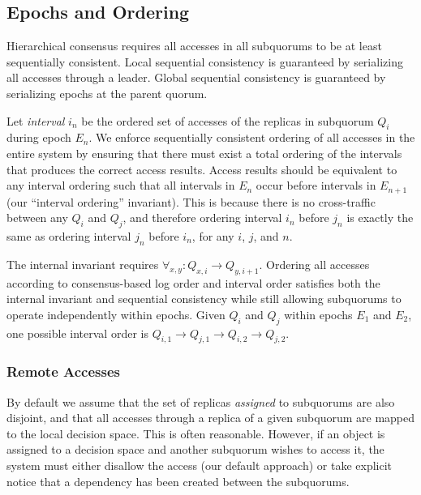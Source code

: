 \documentclass[11pt,letterpaper]{article}
\begin{document}
\subsection{Epochs and Ordering}
\vspace{-.5em}

Hierarchical consensus requires all accesses in all subquorums to be at least
sequentially consistent.
Local sequential consistency is guaranteed by serializing all accesses through a leader.
Global sequential consistency is guaranteed by serializing epochs at the parent quorum.

Let \emph{interval} $i_n$ be the ordered set of accesses of the replicas in subquorum
$Q_i$ during epoch $E_n$.
We enforce sequentially consistent ordering of all accesses in the entire system by
ensuring that there must exist a total ordering of the intervals that produces the correct
access results.
Access results should be equivalent to any interval ordering
such that all intervals in $E_n$ occur before intervals in $E_{n+1}$ (our ``interval
ordering'' invariant).
This is because there is no cross-traffic between any $Q_i$ and $Q_j$, and therefore
ordering interval $i_n$ before $j_n$ is exactly the same as ordering interval $j_n$
before $i_n$, for any $i$, $j$, and $n$.

The internal invariant requires $\forall_{x,y} : Q_{x,i} \rightarrow Q_{y,i+1}$.
Ordering all accesses according to consensus-based log order and interval order satisfies both the
internal invariant and sequential consistency while still allowing subquorums to operate
independently within epochs.
Given $Q_i$ and $Q_j$ within epochs $E_1$ and $E_2$, one possible interval order is
$Q_{i,1} \rightarrow Q_{j,1} \rightarrow Q_{i,2} \rightarrow Q_{j,2}$.

\subsubsection{Remote Accesses}
\vspace{-.5em}

By default we assume that the set of replicas \emph{assigned} to subquorums are also
disjoint, and that all accesses through a replica of a given subquorum are mapped to the
local decision space.
This is often reasonable.
However, if an object is assigned to a decision space and another subquorum wishes to
access it, the system must either disallow the access (our default approach) or take
explicit notice that a dependency has been created between the subquorums.
\end{document}
